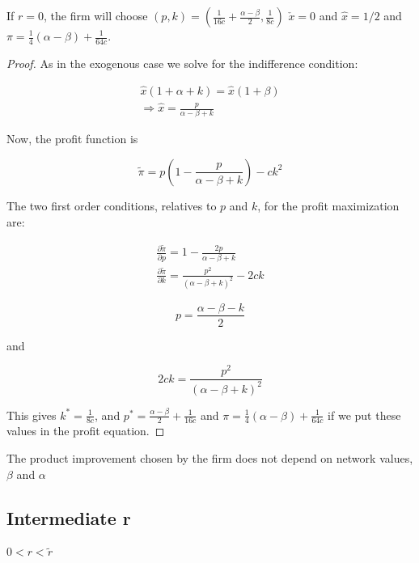 \begin{proposition}
If $r=0$, the firm will choose $(p,k)=(\frac{1}{16c}+\frac{\alpha-\beta}{2},\frac{1}{8c})$ $\check{x}=0$ and $\hat{x}=1/2$ and $\pi= \frac{1}{4}(\alpha-\beta)+\frac{1}{64c}$.
\end{proposition}

\begin{proof}


As in the exogenous case we solve for the indifference condition:

\begin{align*}
\hat{x}(1+\alpha+k)=\hat{x}(1+\beta) \\
\Rightarrow \hat{x} = \frac{p}{\alpha - \beta +k}
\end{align*}


Now, the profit function is

\begin{equation*}
\tilde{\pi} = p\left(1-\frac{p}{\alpha - \beta +k}\right)-c k^2
\end{equation*}

The two first order conditions, relatives to $p$ and $k$, for the profit maximization are:

\begin{align*}
\frac{\partial \tilde{\pi}}{\partial p}= 1-\frac{2p}{\alpha - \beta +k}\\
\frac{\partial \tilde{\pi}}{\partial k}=  \frac{p^2}{(\alpha-\beta+k)^2}-2ck 
\end{align*} 

\begin{equation*}
p = \frac{\alpha-\beta-k}{2}
\end{equation*}

and 

\begin{equation*}
2ck = \frac{p^2}{(\alpha-\beta+k)^2}
\end{equation*}

This gives $k^*=\frac{1}{8c}$,  and $p^*=\frac{\alpha-\beta}{2}+\frac{1}{16c}$ and $\pi=\frac{1}{4}(\alpha-\beta)+\frac{1}{64c} $ if we put these values in the profit equation. 

\end{proof}

\begin{observation}
The product improvement chosen by the firm does not depend on network values, $\beta$ and $\alpha$
\end{observation}


\subsection{Intermediate r}
$0<r<\tilde{r}$

